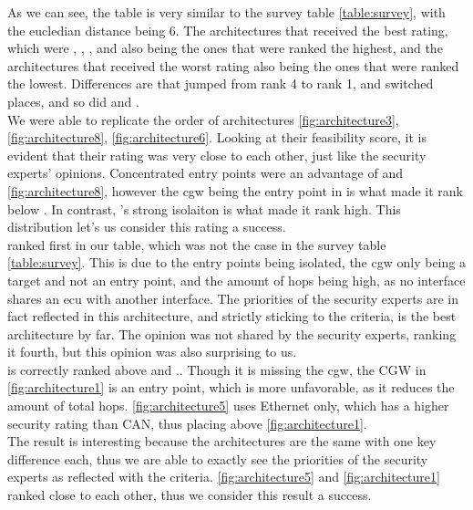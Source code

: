 As we can see, the table is very similar to the survey table \ref{table:survey}, with the eucledian distance being 6.
The architectures that received the best rating, which were 
, , , and  
also being the ones that were ranked the highest,
and the architectures that received the worst rating also being the ones that were ranked the lowest.
Differences are that  jumped from rank 4 to rank 1,  and  switched places, 
and so did  and .\\

We were able to replicate the order of architectures \ref{fig:architecture3}, \ref{fig:architecture8}, \ref{fig:architecture6}.
Looking at their feasibility score, it is evident that their rating was very close to each other, just like the security experts' opinions.
Concentrated entry points were an advantage of  and \ref{fig:architecture8}, 
however the \acrshort{cgw} being the entry point in  is what made it rank below .
In contrast, 's strong isolaiton is what made it rank high.
This distribution let's us consider this rating a success.\\

 ranked first in our table, which was not the case in the survey table \ref{table:survey}.
This is due to the entry points being isolated, the \acrshort{cgw} only being a target and not an entry point, 
and the amount of hops being high, as no interface shares an \acrshort{ecu} with another interface.
The priorities of the security experts are in fact reflected in this architecture, and
strictly sticking to the criteria,  is the best architecture by far.
The opinion was not shared by the security experts, ranking it fourth, but this opinion was also surprising to us.\\

 is correctly ranked above  and ..
Though it is missing the \acrshort{cgw}, the CGW in \ref{fig:architecture1} is an entry point, which is more unfavorable, as it reduces the amount of total hops.
\ref{fig:architecture5} uses Ethernet only, which has a higher security rating than CAN, thus placing above \ref{fig:architecture1}.\\
The result is interesting because the architectures are the same with one key difference each, thus we are able to exactly see the priorities of the security experts
as reflected with the criteria.
\ref{fig:architecture5} and \ref{fig:architecture1} ranked close to each other, thus we consider this result a success.\\

